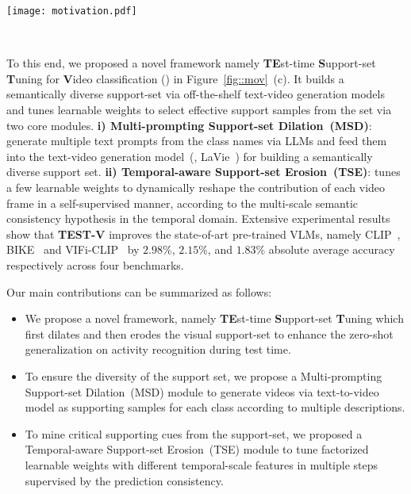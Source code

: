 \begin{figure*}[t]
  \centering
\texttt{[image: motivation.pdf]}
  \caption{Innovation of the zero-shot activity recognition framework. a) Tuning the text input via the given test video in a self-supervised manner. b) Aligning the test video with the label based on the support set from feature similarity or predicted distribution similarity. c) This work combines the above thoughts to construct the support set diversely and tunes this set in a self-supervised manner to mine high-quality support samples.}~\label{fig::mov}
\end{figure*}


{To this end, we proposed a novel framework namely \textbf{TE}st-time \textbf{S}upport-set \textbf{T}uning for \textbf{V}ideo classification (\testv) in Figure~\ref{fig::mov}~(c). It builds a semantically diverse support-set via off-the-shelf text-video generation models and tunes learnable weights to select effective support samples from the set via two core modules. \textbf{i) Multi-prompting Support-set Dilation~(MSD)}: generate multiple text prompts from the class names via LLMs and feed them into the text-video generation model~(\ie, LaVie~\cite{wang2023laviehighqualityvideogeneration}) for building a semantically diverse support set. \textbf{ii) Temporal-aware Support-set Erosion~(TSE)}: tunes a few learnable weights to dynamically reshape the contribution of each video frame in a self-supervised manner, according to the multi-scale semantic consistency hypothesis in the temporal domain. Extensive experimental results show that \textbf{TEST-V} improves the state-of-art pre-trained VLMs, namely CLIP~\cite{radford2021learning}, BIKE~\cite{wu2023bidirectional} and VIFi-CLIP~\cite{hanoonavificlip} by {$2.98\%$}, $2.15\%$, and $1.83\%$ absolute average accuracy respectively across four benchmarks. 
}

{Our main contributions can be summarized as follows:
\begin{itemize}
    \item We propose a novel framework, namely \textbf{TE}st-time \textbf{S}upport-set \textbf{T}uning which first dilates and then erodes the visual support-set to enhance the zero-shot generalization on activity recognition during test time.
    \item To ensure the diversity of the support set, we propose a Multi-prompting Support-set Dilation~(MSD) module to generate videos via text-to-video model as supporting samples for each class according to multiple descriptions.
    \item To mine critical supporting cues from the support-set, we proposed a Temporal-aware Support-set Erosion~(TSE) module to tune factorized learnable weights with different temporal-scale features in multiple steps supervised by the prediction consistency.
\end{itemize}
}